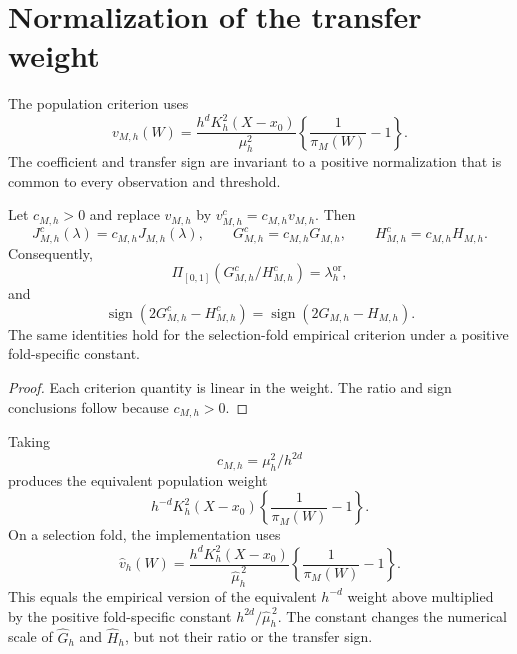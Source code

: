 \section{Normalization of the transfer weight}
\label{sec:supp-weight-normalization}

The population criterion uses
\[
v_{M,h}(W)
=
\frac{h^dK_h^2(X-x_0)}{\mu_h^2}
\left\{\frac1{\pi_M(W)}-1\right\}.
\]
The coefficient and transfer sign are invariant to a positive normalization that is common to every observation and threshold.

\begin{lemma}
\label{lem:weight-normalization}
Let \(c_{M,h}>0\) and replace \(v_{M,h}\) by \(v_{M,h}^{c}=c_{M,h}v_{M,h}\). Then
\[
J_{M,h}^{c}(\lambda)=c_{M,h}J_{M,h}(\lambda),
\qquad
G_{M,h}^{c}=c_{M,h}G_{M,h},
\qquad
H_{M,h}^{c}=c_{M,h}H_{M,h}.
\]
Consequently,
\[
\Pi_{[0,1]}(G_{M,h}^{c}/H_{M,h}^{c})
=
\lambda_h^{\mathrm{or}},
\]
and
\[
\operatorname{sign}(2G_{M,h}^{c}-H_{M,h}^{c})
=
\operatorname{sign}(2G_{M,h}-H_{M,h}).
\]
The same identities hold for the selection-fold empirical criterion under a positive fold-specific constant.
\end{lemma}

\begin{proof}
Each criterion quantity is linear in the weight. The ratio and sign conclusions follow because \(c_{M,h}>0\).
\end{proof}

Taking
\[
c_{M,h}=\mu_h^2/h^{2d}
\]
produces the equivalent population weight
\[
h^{-d}K_h^2(X-x_0)
\left\{\frac1{\pi_M(W)}-1\right\}.
\]
On a selection fold, the implementation uses
\[
\widehat v_h(W)
=
\frac{h^dK_h^2(X-x_0)}{\widehat\mu_h^{\,2}}
\left\{\frac1{\pi_M(W)}-1\right\}.
\]
This equals the empirical version of the equivalent \(h^{-d}\) weight above
multiplied by the positive fold-specific constant
\(h^{2d}/\widehat\mu_h^{\,2}\). The constant changes the numerical scale of
\(\widehat G_h\) and \(\widehat H_h\), but not their ratio or the transfer sign.
